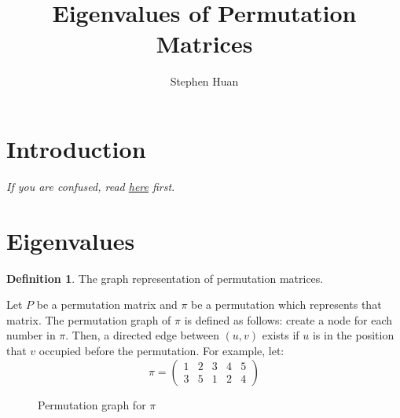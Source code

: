 \documentclass[11pt, oneside]{article}
\title{Eigenvalues of Permutation Matrices}
\author{Stephen Huan}
\theoremstyle{plain}
\theoremstyle{definition}
\newtheorem{definition}{Definition}[section]
\begin{document}
\maketitle

\section{Introduction}

\textit{If you are confused, read \href{https://activities.tjhsst.edu/cubing/static/pdfs/Linearization/linear.pdf}{here} first}.

\section{Eigenvalues}

\begin{definition}
The graph representation of permutation matrices.
\end{definition}

Let \( P \) be a permutation matrix and \( \pi \) be a permutation which
represents that matrix. The permutation graph of \( \pi \) is defined
as follows: create a node for each number in \( \pi \).
Then, a directed edge between \( (u, v) \) exists if \( u \)
is in the position that \( v \) occupied before the permutation.
For example, let:
\[ \pi = \begin{pmatrix}
         1 & 2 & 3 & 4 & 5 \\
         3 & 5 & 1 & 2 & 4
        \end{pmatrix}
\]

\begin{figure}[h!]
    \centering
    \caption{Permutation graph for \( \pi \)}
\end{figure}
\end{document}
